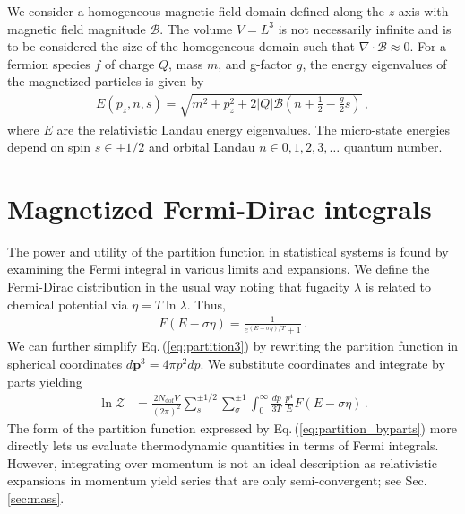 \documentclass[epjST]{svjour}
\newcommand{\req}[1]{Eq.\,(\ref{#1})}
\newcommand{\rsec}[1]{Sec.\,{\ref{#1}}}
\numberwithin{equation}{section}
\begin{document}
We consider a homogeneous magnetic field domain defined along the $z$-axis with magnetic field magnitude $\mathcal{B}$. The volume $V=L^{3}$ is not necessarily infinite and is to be considered the size of the homogeneous domain such that $\nabla\cdot\mathcal{B}\approx0$. For a fermion species $f$ of charge $Q$, mass $m$, and g-factor $g$, the energy eigenvalues of the magnetized particles is given by~\cite{Steinmetz:2018ryf}
\begin{align}
    \label{eq:energystates}
    E(p_{z},n,s)=\sqrt{m^{2}+p_{z}^{2}+2|Q|\mathcal{B}\left(n+\frac{1}{2}-\frac{g}{2}s\right)}\,,
\end{align}
where $E$ are the relativistic Landau energy eigenvalues. The micro-state energies depend on spin $s\in\pm1/2$ and orbital Landau $n\in0,1,2,3,\ldots$ quantum number.

\section{Magnetized Fermi-Dirac integrals}
\label{sec:fermi_integrals}
The power and utility of the partition function in statistical systems is found by examining the Fermi integral in various limits and expansions. We define the Fermi-Dirac distribution in the usual way noting that fugacity \(\lambda\) is related to chemical potential via \(\eta = T\ln\lambda\). Thus,
\begin{align}
    F\left(E - \sigma\eta\right) = \frac{1}{e^{(E - \sigma\eta)/T} + 1}\,.
\end{align}
We can further simplify \req{eq:partition3} by rewriting the partition function in spherical coordinates \(d\mathbf{p}^{3}=4\pi p^{2}dp\). We substitute coordinates and integrate by parts yielding
\begin{align}
    \label{eq:partition_byparts}
    \ln\mathcal{Z} &= \frac{2 N_\mathrm{dof}V}{(2\pi)^{2}} \sum_{s}^{\pm1/2}\sum_{\sigma}^{\pm1}\int_{0}^{\infty} \frac{dp}{3T} \, \frac{p^4}{E}F\left(E - \sigma\eta\right)\,.
\end{align}
The form of the partition function expressed by \req{eq:partition_byparts} more directly lets us evaluate thermodynamic quantities in terms of Fermi integrals. However, integrating over momentum is not an ideal description as relativistic expansions in momentum yield series that are only semi-convergent; see \rsec{sec:mass}.

\end{document}
